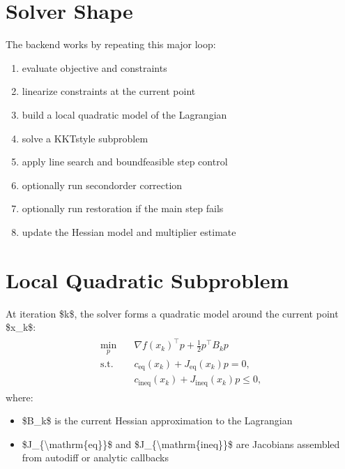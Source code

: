 \documentclass[letterpaper,10pt,english]{sphinxmanual}
\begin{document}
\section{Solver Shape}
\label{\detokenize{optima_sequential_qp:solver-shape}}
\sphinxAtStartPar
The backend works by repeating this major loop:
\begin{enumerate}
%
\item {} 
\sphinxAtStartPar
evaluate objective and constraints

\item {} 
\sphinxAtStartPar
linearize constraints at the current point

\item {} 
\sphinxAtStartPar
build a local quadratic model of the Lagrangian

\item {} 
\sphinxAtStartPar
solve a KKT\sphinxhyphen{}style subproblem

\item {} 
\sphinxAtStartPar
apply line search and bound\sphinxhyphen{}feasible step control

\item {} 
\sphinxAtStartPar
optionally run second\sphinxhyphen{}order correction

\item {} 
\sphinxAtStartPar
optionally run restoration if the main step fails

\item {} 
\sphinxAtStartPar
update the Hessian model and multiplier estimate

\end{enumerate}


\section{Local Quadratic Subproblem}
\label{\detokenize{optima_sequential_qp:local-quadratic-subproblem}}
\sphinxAtStartPar
At iteration \$k\$, the solver forms a quadratic model around the current point \$x\_k\$:
\begin{equation*}
\begin{split}\begin{aligned}
\min_p \quad &
\nabla f(x_k)^\top p + \tfrac12 p^\top B_k p \\
\text{s.t.} \quad &
c_{\mathrm{eq}}(x_k) + J_{\mathrm{eq}}(x_k) p = 0, \\
& c_{\mathrm{ineq}}(x_k) + J_{\mathrm{ineq}}(x_k) p \le 0,
\end{aligned}\end{split}
\end{equation*}
\sphinxAtStartPar
where:
\begin{itemize}
\item {} 
\sphinxAtStartPar
\$B\_k\$ is the current Hessian approximation to the Lagrangian

\item {} 
\sphinxAtStartPar
\$J\_\{\textbackslash{}mathrm\{eq\}\}\$ and \$J\_\{\textbackslash{}mathrm\{ineq\}\}\$ are Jacobians assembled from autodiff or analytic callbacks

\end{itemize}
\end{document}
